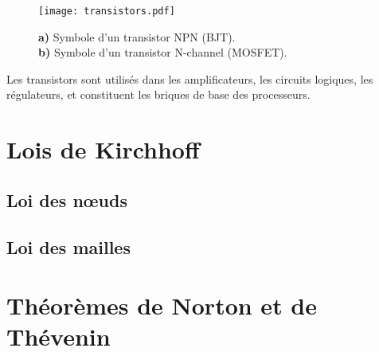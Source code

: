 \begin{figure}[H]
    \centering
    \texttt{[image: transistors.pdf]}
    \caption{\centering\newline
        \textbf{a)} Symbole d’un transistor NPN (BJT).\\
        \textbf{b)} Symbole d’un transistor N-channel (MOSFET).
    }
\end{figure}

Les transistors sont utilisés dans les amplificateurs,
les circuits logiques, les régulateurs, et constituent les briques de base des processeurs.
\section{Lois de Kirchhoff} \label{subsec:kirchhoff}
\subsection{Loi des nœuds} \label{subsec:noeuds}

\subsection{Loi des mailles} \label{subsec:mailles}

\section{Théorèmes de Norton et de Thévenin} \label{subsec:norton_thevenin}
